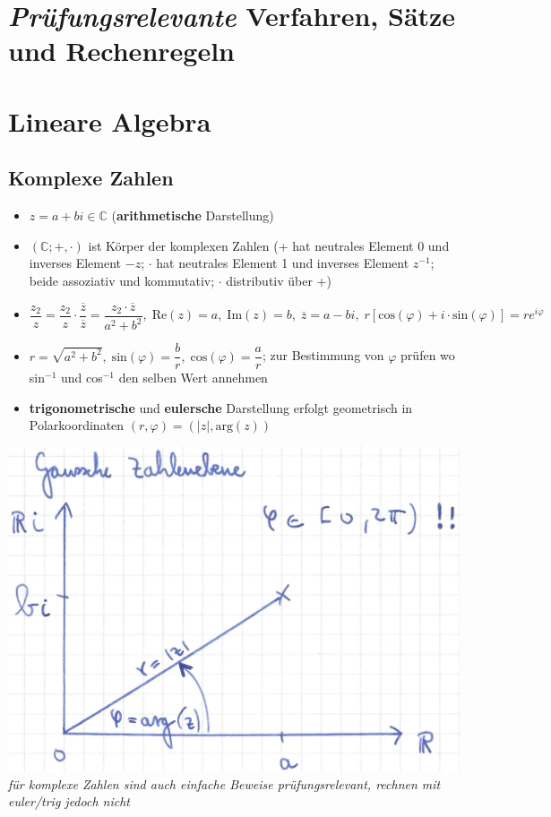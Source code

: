 \documentclass[10pt,a4paper]{article}
\begin{document}
\section*{\textit{Prüfungsrelevante} Verfahren, Sätze und Rechenregeln}
\section{Lineare Algebra}



\subsection{Komplexe Zahlen}
\begin{itemize}
\item $z=a+bi \in \mathbb{C}$ (\textbf{arithmetische} Darstellung)
\item $(\mathbb{C};+,\cdot)$ ist Körper der komplexen Zahlen (+ hat neutrales Element 0 und inverses Element $-z$; $\cdot$ hat neutrales Element 1 und inverses Element $z^{-1}$; beide assoziativ und kommutativ; $\cdot$ distributiv über +)
\item $\dfrac{z_{2}}{z}=\dfrac{z_{2}}{z}\cdot \dfrac{\overline{z}}{\overline{z}}=\dfrac{z_{2}\cdot \overline{z}}{a^2+b^2},\; \text{Re}(z)=a, \; \text{Im}(z)=b, \; \overline{z}=a-bi,\; r[\text{cos}(\varphi)+i\cdot \text{sin}(\varphi)]=re^{i\varphi}$
\item $r=\sqrt{a^2+b^2},\; \text{sin}(\varphi)=\dfrac{b}{r}, \;\text{cos}(\varphi)=\dfrac{a}{r}$; zur Bestimmung von $\varphi$ prüfen wo sin$^{-1}$ und cos$^{-1}$ den selben Wert annehmen 
\item \textbf{trigonometrische} und \textbf{eulersche} Darstellung erfolgt geometrisch in Polarkoordinaten $(r,\varphi)=(\vert z\vert,\text{arg}(z))$
\end{itemize}
\begin{center}
\includegraphics[scale=0.55]{gaussche_zahlenebene.jpg}\\
\textit{für komplexe Zahlen sind auch einfache Beweise prüfungsrelevant, rechnen mit euler/trig jedoch nicht}
\end{center}
\end{document}
